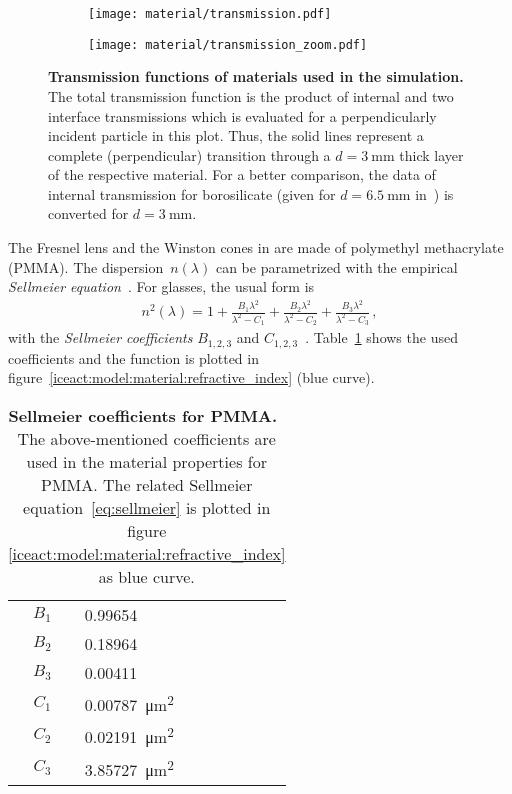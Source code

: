 \begin{figure}[H]
	\centering
	\begin{subfigure}[t]{0.485\textwidth}
		\texttt{[image: material/transmission.pdf]}
	\end{subfigure}
	\hfill
	\begin{subfigure}[t]{0.499\textwidth}
		\texttt{[image: material/transmission\_zoom.pdf]}
	\end{subfigure}
	\caption[Transmission of used materials]{\textbf{Transmission functions of materials used in the simulation.} The total transmission function is the product of internal and two interface transmissions which is evaluated for a perpendicularly incident particle in this plot. Thus, the solid lines represent a complete (perpendicular) transition through a $d=\SI{3}{\milli\meter}$ thick layer of the respective material. For a better comparison, the data of internal transmission for borosilicate (given for $d=\SI{6.5}{\milli\meter}$ in~\cite{iceact:borosilicate:datasheet}) is converted for  $d=\SI{3}{\milli\meter}$.}
	\label{iceact:model:material:transmission}	
\end{figure}

The Fresnel lens and the Winston cones in \iceact are made of polymethyl methacrylate (PMMA). The dispersion~$n(\lambda)$ can be parametrized with the empirical \textit{Sellmeier equation}~\cite{iceact:sellmeier}. For glasses, the usual form is
\begin{align}
	n^2(\lambda) = 1 + \frac{B_1\lambda^2}{\lambda^2-C_1} + \frac{B_2\lambda^2}{\lambda^2-C_2} + \frac{B_3\lambda^2}{\lambda^2-C_3}\,,
	\label{eq:sellmeier}
\end{align}
with the \textit{Sellmeier coefficients} $B_{1,2,3}$ and $C_{1,2,3}$~\cite{iceact:sellmeier}. Table~\ref{iceact:model:pmma_sellmeiercoeffs} shows the used coefficients and the function is plotted in figure~\ref{iceact:model:material:refractive_index} (blue curve).

\begin{table}[H]
	\centering
	\begin{tabular}{c|l}
		\midrule
		$B_1$  & \num{0.99654}  \\
		$B_2$  & \num{0.18964}  \\
		$B_3$  & \num{0.00411}  \\
		$C_1$  & \SI{0.00787}{\micro\meter\squared}  \\
		$C_2$  & \SI{0.02191}{\micro\meter\squared}  \\
		$C_3$  & \SI{3.85727}{\micro\meter\squared}  \\
		\bottomrule
	\end{tabular}
	\caption[Sellmeier coefficients for PMMA]{\textbf{Sellmeier coefficients for PMMA.}~\cite{iceact:refractiveindex} The above-mentioned coefficients are used in the \geant material properties for PMMA. The related Sellmeier equation~\eqref{eq:sellmeier} is plotted in figure \ref{iceact:model:material:refractive_index} as blue curve.}
	\label{iceact:model:pmma_sellmeiercoeffs}
\end{table}

